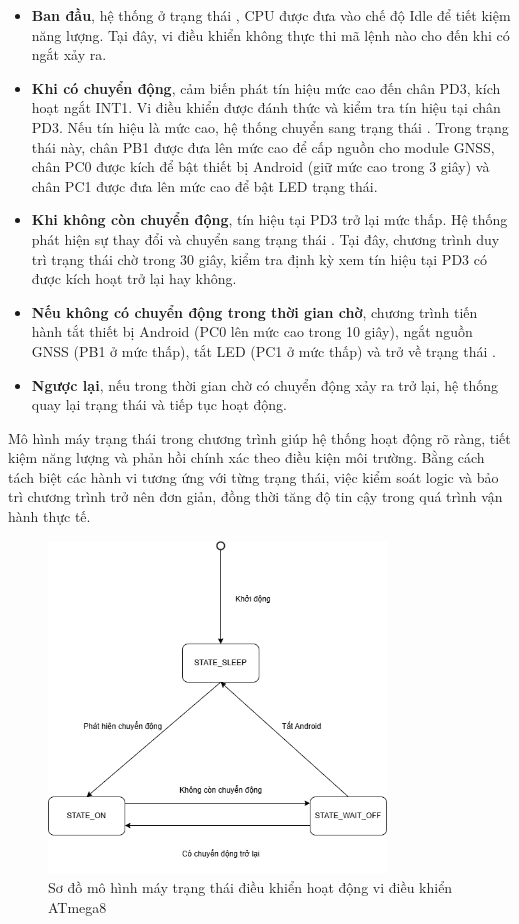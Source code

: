 \documentclass[../DoAn.tex]{subfiles}
\begin{document}
\begin{itemize}
    \item \textbf{Ban đầu}, hệ thống ở trạng thái , CPU được đưa vào chế độ Idle để tiết kiệm năng lượng. Tại đây, vi điều khiển không thực thi mã lệnh nào cho đến khi có ngắt xảy ra.
    
    \item \textbf{Khi có chuyển động}, cảm biến phát tín hiệu mức cao đến chân PD3, kích hoạt ngắt INT1. Vi điều khiển được đánh thức và kiểm tra tín hiệu tại chân PD3. Nếu tín hiệu là mức cao, hệ thống chuyển sang trạng thái . Trong trạng thái này, chân PB1 được đưa lên mức cao để cấp nguồn cho module GNSS, chân PC0 được kích để bật thiết bị Android (giữ mức cao trong 3 giây) và chân PC1 được đưa lên mức cao để bật LED trạng thái.

    \item \textbf{Khi không còn chuyển động}, tín hiệu tại PD3 trở lại mức thấp. Hệ thống phát hiện sự thay đổi và chuyển sang trạng thái . Tại đây, chương trình duy trì trạng thái chờ trong 30 giây, kiểm tra định kỳ xem tín hiệu tại PD3 có được kích hoạt trở lại hay không.

    \item \textbf{Nếu không có chuyển động trong thời gian chờ}, chương trình tiến hành tắt thiết bị Android (PC0 lên mức cao trong 10 giây), ngắt nguồn GNSS (PB1 ở mức thấp), tắt LED (PC1 ở mức thấp) và trở về trạng thái .

    \item \textbf{Ngược lại}, nếu trong thời gian chờ có chuyển động xảy ra trở lại, hệ thống quay lại trạng thái  và tiếp tục hoạt động.
\end{itemize}

Mô hình máy trạng thái trong chương trình giúp hệ thống hoạt động rõ ràng, tiết kiệm năng lượng và phản hồi chính xác theo điều kiện môi trường. Bằng cách tách biệt các hành vi tương ứng với từng trạng thái, việc kiểm soát logic và bảo trì chương trình trở nên đơn giản, đồng thời tăng độ tin cậy trong quá trình vận hành thực tế.

\begin{figure}[H]
    \centering
    \includegraphics[width=0.8\textwidth]{Hinhve/State_machine.png}
    \caption{Sơ đồ mô hình máy trạng thái điều khiển hoạt động vi điều khiển ATmega8}
    \label{fig:state_machine}
\end{figure}
\end{document}
